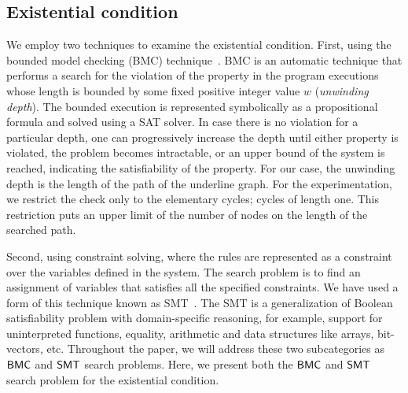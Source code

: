 \subsection{Existential condition}
\noindent We employ two techniques to examine the existential condition. 
%
First, using the bounded model checking (BMC) technique~\cite{biere1999symbolic1, biere2003bounded}.
%
%
BMC is an automatic technique that performs a search for the violation of the property in the program executions whose length is bounded by some fixed positive integer value $w$ (\textit{unwinding depth}). 
%
The bounded execution is represented symbolically as a propositional formula and solved using a SAT solver.
%
In case there is no violation for a particular depth, one can progressively increase the depth until either property is violated, the problem becomes intractable, or an upper bound of the system is reached, indicating the satisfiability of the property.
%
For our case, the unwinding depth is the length of the path of the underline graph.
%
%
For the experimentation, we restrict the check only to the elementary cycles; cycles of length one. 
%
This restriction puts an upper limit of the number of nodes on the length of the searched path. 
%
%

Second, using constraint solving, where the rules are represented as a constraint over the variables defined in the system.
%
The search problem is to find an assignment of variables that satisfies all the specified constraints.
%
We have used a form of this technique known as SMT~\cite{nieuwenhuis2006solving, barrett2018satisfiability}.
%
The SMT is a generalization of Boolean satisfiability problem with domain-specific reasoning, for example, support for uninterpreted functions, equality, arithmetic and data structures like arrays, bit-vectors, etc. 
%
%
Throughout the paper, we will address these two subcategories as $\mathsf{BMC}$ and $\mathsf{SMT}$ search problems.
%
%
Here, we present both the $\mathsf{BMC}$ and $\mathsf{SMT}$ search problem for the existential condition.

